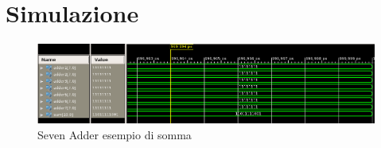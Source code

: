 %

\section{Simulazione}

\begin{figure}[H]
	\centering
\includegraphics[scale=0.50]{esercizio12/images/seven_operation_adder_testbench.png}
	\caption{Seven Adder esempio di somma}
\end{figure}%

